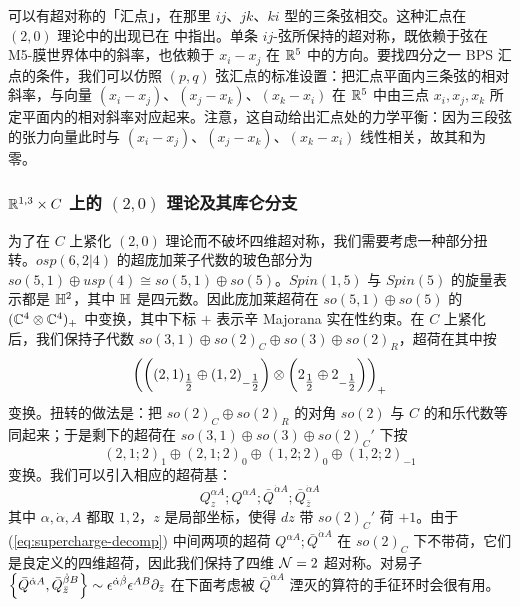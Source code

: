 可以有超对称的「汇点」，在那里 $ij$、$jk$、$ki$ 型的三条弦相交。这种汇点在 $(2,0)$ 理论中的出现已在 \cite{Lee:2006gqa} 中指出。单条 $ij$-弦所保持的超对称，既依赖于弦在 M5-膜世界体中的斜率，也依赖于 $x_i-x_j$ 在 $\mathbb{R}^5$ 中的方向。要找四分之一 BPS 汇点的条件，我们可以仿照 $(p,q)$ 弦汇点的标准设置\cite{Sen:1997xi, Aharony:1997bh, Dasgupta:1997pu}：把汇点平面内三条弦的相对斜率，与向量 $(x_i-x_j)$、$(x_j-x_k)$、$(x_k-x_i)$ 在 $\mathbb{R}^5$ 中由三点 $x_i, x_j, x_k$ 所定平面内的相对斜率对应起来。注意，这自动给出汇点处的力学平衡：因为三段弦的张力向量此时与 $(x_i-x_j)$、$(x_j-x_k)$、$(x_k-x_i)$ 线性相关，故其和为零。

\subsubsection{$\mathbb{R}^{1,3} \times C$ 上的 $(2,0)$ 理论及其库仑分支}

为了在 $C$ 上紧化 $(2,0)$ 理论而不破坏四维超对称，我们需要考虑一种部分扭转。$osp(6,2\vert 4)$ 的超庞加莱子代数的玻色部分为 $so(5,1) \oplus usp(4)\cong so(5,1) \oplus so(5)$。$Spin(1,5)$ 与 $Spin(5)$ 的旋量表示都是 ${\mathbb{H}}^2$，其中 ${\mathbb{H}}$ 是四元数。因此庞加莱超荷在 $so(5,1) \oplus so(5)$ 的 $(\mathbb{C}^4\otimes \mathbb{C}^4)_{+}$ 中变换，其中下标 $+$ 表示辛 Majorana 实在性约束。在 $C$ 上紧化后，我们保持子代数 $so(3,1)\oplus so(2)_C \oplus so(3) \oplus so(2)_R$，超荷在其中按
\begin{equation}
\left( \left((2,1)_{\tfrac{1}{2}} \oplus (1,2)_{-\tfrac{1}{2}} \right) \otimes
\left(2_{\tfrac{1}{2}} \oplus 2_{-\tfrac{1}{2}} \right) \right)_+
\end{equation}
变换。扭转的做法是：把 $so(2)_C\oplus so(2)_R$ 的对角 $so(2)$ 与 $C$ 的和乐代数等同起来；于是剩下的超荷在 $so(3,1) \oplus so(3) \oplus so(2)_C'$ 下按
\begin{equation}\label{eq:supercharge-decomp}
(2,1;2)_{1} \oplus (2,1;2)_0 \oplus (1,2;2)_0 \oplus (1,2;2)_{-1}
\end{equation}
变换。我们可以引入相应的超荷基：
\begin{equation}
Q_z^{\alpha A} ; Q^{\alpha A}; \bar Q^{\dot \alpha A}; \bar Q_{\bar z}^{\dot \alpha A}
\end{equation}
其中 $\alpha, \dot \alpha, A$ 都取 $1,2$，$z$ 是局部坐标，使得 $dz$ 带 $so(2)_C'$ 荷 $+1$。由于 (\ref{eq:supercharge-decomp}) 中间两项的超荷 $Q^{\alpha A}; \bar Q^{\dot \alpha A}$ 在 $so(2)_C$ 下不带荷，它们是良定义的四维超荷，因此我们保持了四维 $\mathcal{N}=2$ 超对称。对易子 $\left\{ \bar Q^{\dot \alpha A}, \bar Q_{\bar z}^{\dot \beta B}\right\} \sim \epsilon^{\dot \alpha \dot \beta} \epsilon^{AB}\partial_{\bar z}$ 在下面考虑被 $\bar Q^{\dot \alpha A}$ 湮灭的算符的手征环时会很有用。

